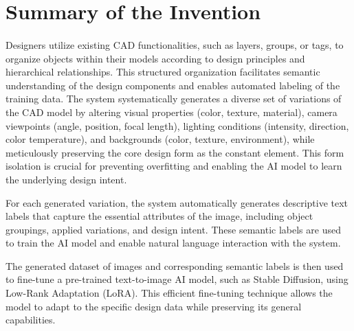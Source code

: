 \documentclass{article}
\begin{document}
\section{Summary of the Invention}


\paragraph{}Designers utilize existing CAD functionalities, such as layers, groups, or tags, to organize objects within their models according to design principles and hierarchical relationships. This structured organization facilitates semantic understanding of the design components and enables automated labeling of the training data. The system systematically generates a diverse set of variations of the CAD model by altering visual properties (color, texture, material), camera viewpoints (angle, position, focal length), lighting conditions (intensity, direction, color temperature), and backgrounds (color, texture, environment), while meticulously preserving the core design form as the constant element. This form isolation is crucial for preventing overfitting and enabling the AI model to learn the underlying design intent.

For each generated variation, the system automatically generates descriptive text labels that capture the essential attributes of the image, including object groupings, applied variations, and design intent. These semantic labels are used to train the AI model and enable natural language interaction with the system.

The generated dataset of images and corresponding semantic labels is then used to fine-tune a pre-trained text-to-image AI model, such as Stable Diffusion, using Low-Rank Adaptation (LoRA). This efficient fine-tuning technique allows the model to adapt to the specific design data while preserving its general capabilities.
\end{document}
